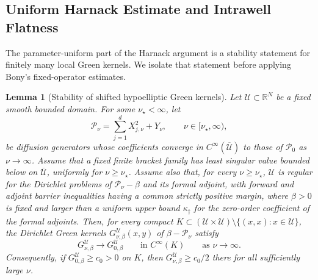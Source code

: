 \documentclass[11pt]{article}
\numberwithin{equation}{section}
\theoremstyle{plain}
\newtheorem{lemma}[theorem]{Lemma}
\theoremstyle{definition}
\theoremstyle{remark}
\newcommand{\R}{\mathbb R}
\begin{document}
\subsection{Uniform Harnack Estimate and Intrawell Flatness}
\label{app:lyapunov}

The parameter-uniform part of the Harnack argument is a stability statement
for finitely many local Green kernels.  We isolate that statement before
applying Bony's fixed-operator estimates.

\begin{lemma}[Stability of shifted hypoelliptic Green kernels]
\label{lem:shifted-green-kernel-stability}
Let $\mathscr U\subset\R^N$ be a fixed smooth bounded domain.  For some
$\nu_\star<\infty$, let
\[
\mathscr P_\nu=\sum_{j=1}^dX_{j,\nu}^2+Y_\nu,
\qquad \nu\in[\nu_\star,\infty),
\]
be diffusion generators whose coefficients converge in
$C^\infty(\overline{\mathscr U})$ to those of $\mathscr P_0$ as
$\nu\to\infty$.  Assume that a
fixed finite bracket family has least singular value bounded below on
$\overline{\mathscr U}$, uniformly for $\nu\ge\nu_\star$.  Assume also that,
for every $\nu\ge\nu_\star$,
$\mathscr U$ is regular for the Dirichlet problems of
$\mathscr P_\nu-\beta$ and its formal adjoint, with forward and adjoint
barrier inequalities having a common strictly positive margin, where
$\beta>0$ is fixed and larger than a uniform upper bound
$\kappa_\dagger$ for the zero-order coefficient of the formal adjoints.
Then, for every compact
$K\subset(\mathscr U\times\mathscr U)\setminus\{(x,x):x\in\mathscr U\}$,
the Dirichlet Green kernels $G_{\nu,\beta}^{\mathscr U}(x,y)$ of
$\beta-\mathscr P_\nu$ satisfy
\begin{equation}
\label{eq:shifted-green-convergence}
G_{\nu,\beta}^{\mathscr U}\longrightarrow
G_{0,\beta}^{\mathscr U}
\qquad\text{in }C^\infty(K)\qquad\text{as $\nu\to\infty$}.
\end{equation}
Consequently, if $G_{0,\beta}^{\mathscr U}\ge c_0>0$ on $K$, then
$G_{\nu,\beta}^{\mathscr U}\ge c_0/2$ there for all sufficiently large
$\nu$.
\end{lemma}
\end{document}
